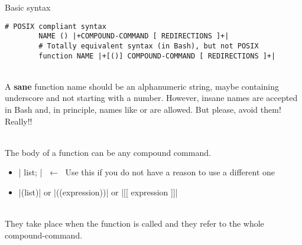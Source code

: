 \begin{frame}[fragile]{Basic syntax}
    \vspace{-2mm}
    \begin{lstlisting}[style=MyBash, numbers=none]
        # POSIX compliant syntax
        NAME () |+COMPOUND-COMMAND [ REDIRECTIONS ]+|
        # Totally equivalent syntax (in Bash), but not POSIX
        function NAME |+[()] COMPOUND-COMMAND [ REDIRECTIONS ]+|
    \end{lstlisting}
    \vspace{1mm}
    \begin{description}[X]
        \setlength{\itemsep}{3mm}
        \item[\textbf{NAME:}] ~\\
            A \textbf{sane} function name should be an alphanumeric string, maybe containing underscore and not starting with a number.
            However, insane names are accepted in Bash and, in principle, names like \PB{\texttt{:}} or \PB{\texttt{[\}\{}} are allowed.
            But please, avoid them! Really!! $\;${\tiny{}}
        \item[\textbf{COMPOUND-COMMAND:}] ~\\
            The body of a function can be any compound command.
            \begin{itemize}
                \item \bash|{ list; }| \alert{$\;\longleftarrow\;$ Use this if you do not have a reason to use a different one}
                \item \bash|(list)| or \bash|((expression))| or \bash|[[ expression ]]|
            \end{itemize}
        \item[\textbf{REDIRECTIONS:}] ~\\
            They take place when the function is called and they refer to the whole compound-command.
    \end{description}
\end{frame}
